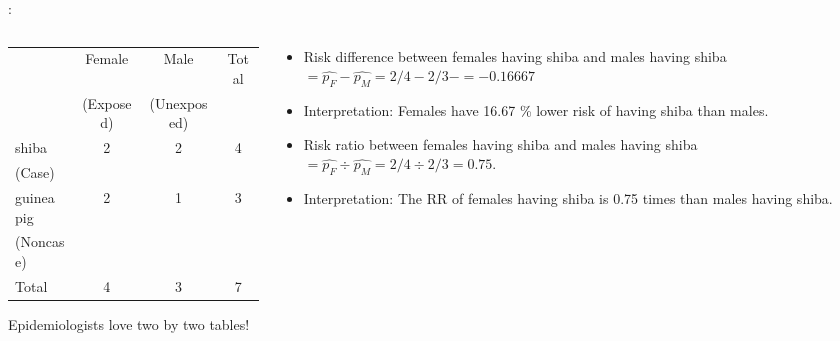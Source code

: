 \begin{frame}{\secname: \subsecname}
\begin{columns}[t]
\begin{column}{0.5\textwidth}
\vspace{-10mm}
\begin{table}[h]
	\scriptsize
\begin{center}
\begin{tabular}{lccc}
\toprule
   & Female    & Male            & Total  \\ 
   & (Exposed) & (Unexposed)     &        \\ \midrule
shiba  & 2        & 2            & 4         \\
(Case) &          &              &           \\
guinea pig   & 2        & 1            & 3   \\
(Noncase) &          &              &           \\

Total  & 4        & 3            & 7     \\ \bottomrule
\end{tabular}
\end{center}
\end{table}

Epidemiologists love two by two tables!
\end{column}
    
\begin{column}{0.5\textwidth}
	\normalsize
	\begin{itemize}
		\item<2|handout:2-> Risk difference between females having shiba and males having shiba $= \widehat{p_F}- \widehat{p_M} = 2/4 - 2/3 -  = - 0.16667$
		\item<2|handout:2-> Interpretation: Females have 16.67 \% lower risk of having shiba than males. 
		\newline
		\item<3|handout:3> Risk ratio between females having shiba and males having shiba  $= \widehat{p_F} \div  \widehat{p_M} = 2/4 \div 2/3    = 0.75$.
		\item<3|handout:3> Interpretation: The RR of females having shiba is 0.75 times than males having shiba.

	\end{itemize}
\end{column}
    
\end{columns}
\end{frame}

